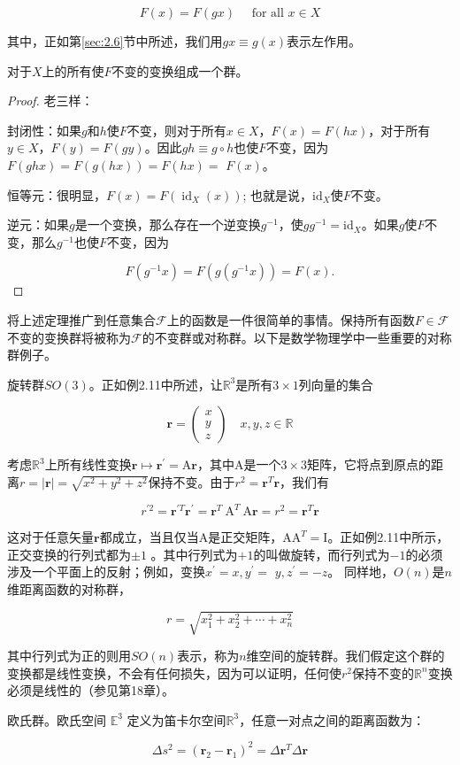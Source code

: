 $$
F(x)=F(g x) \quad \text { for all } x \in X
$$

其中，正如第\ref{sec:2.6}节中所述，我们用$g x \equiv g(x)$表示左作用。
\begin{theorem}
    对于$X$上的所有使$F$不变的变换组成一个群。
\end{theorem}
\begin{proof}
    老三样：

封闭性：如果$g$和$h$使$F$不变，则对于所有$x \in X$，$F(x)=F(h x)$，对于所有$y \in X$，$F(y)=F(g y)$。因此$g h \equiv g \circ h$也使$F$不变，因为$F(g h x)=F(g(h x))=F(h x)=$ $F(x)$。

恒等元：很明显，$F(x)=F\left(\operatorname{id}_{X}(x)\right)$; 也就是说，$\mathrm{id}_{X}$使$F$不变。

逆元：如果$g$是一个变换，那么存在一个逆变换$g^{-1}$，使$g g^{-1}=\mathrm{id}_{X}$。如果$g$使$F$不变，那么$g^{-1}$也使$F$不变，因为

$$
F\left(g^{-1} x\right)=F\left(g\left(g^{-1} x\right)\right)=F(x) .
$$
\end{proof}
将上述定理推广到任意集合$\mathcal{F}$上的函数是一件很简单的事情。保持所有函数$F \in \mathcal{F}$不变的变换群将被称为$\mathcal{F}$的不变群或对称群。以下是数学物理学中一些重要的对称群例子。
\begin{eg}
    旋转群$SO(3)$。正如例2.11中所述，让$\mathbb{R}^3$是所有$3 \times 1$列向量的集合

$$
\mathbf{r}=\left(\begin{array}{l}
x \\
y \\
z
\end{array}\right) \quad  x, y, z \in \mathbb{R}
$$

考虑$\mathbb{R}^3$上所有线性变换$\mathbf{r} \mapsto \mathbf{r}^{\prime}=\mathrm{A} \mathbf{r}$，其中$\mathrm{A}$是一个$3 \times 3$矩阵，它将点到原点的距离$r=|\mathbf{r}|=\sqrt{x^{2}+y^{2}+z^{2}}$保持不变。由于$r^2=\mathbf{r}^T \mathbf{r}$，我们有

$$
r^{\prime 2}=\mathbf{r}^{\prime T} \mathbf{r}^{\prime}=\mathbf{r}^{T} \mathrm{~A}^{T} \mathrm{~A} \mathbf{r}=r^{2}=\mathbf{r}^{T} \mathbf{r}
$$

这对于任意矢量$\mathbf{r}$都成立，当且仅当$\mathrm{A}$是正交矩阵，$\mathrm{AA}^{T}=\mathrm{I}$。正如例2.11中所示，正交变换的行列式都为$\pm 1$ 。其中行列式为$+1$的叫做旋转，而行列式为$-1$的必须涉及一个平面上的反射；例如，变换$x^{\prime}=x, y^{\prime}=$ $y, z^{\prime}=-z$。
同样地，$O(n)$是$n$维距离函数的对称群，

$$
r=\sqrt{x_{1}^{2}+x_{2}^{2}+\cdots+x_{n}^{2}}
$$

其中行列式为正的则用$S O(n)$表示，称为$n$维空间的旋转群。我们假定这个群的变换都是线性变换，不会有任何损失，因为可以证明，任何使$r^{2}$保持不变的$\mathbb{R}^{n}$变换必须是线性的（参见第18章）。
\end{eg}

\begin{eg}
    欧氏群。欧氏空间 $\mathbb{E}^{3}$ 定义为笛卡尔空间$\mathbb{R}^{3}$，任意一对点之间的距离函数为：

$$
\Delta s^{2}=\left(\mathbf{r}_{2}-\mathbf{r}_{1}\right)^{2}=\Delta \mathbf{r}^{T} \Delta \mathbf{r}
$$
\end{eg}

